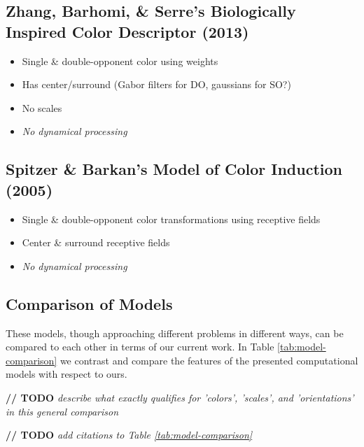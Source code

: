 \documentclass[journal,onecolumn]{IEEEtran}
\begin{document}
\subsection*{Zhang, Barhomi, \& Serre's Biologically Inspired Color Descriptor (2013)}
\begin{itemize}
    \item Single \& double-opponent color using weights
    \item Has center/surround (Gabor filters for DO, gaussians for SO?)
    \item No scales
    \item \textit{No dynamical processing}
\end{itemize}


\subsection*{Spitzer \& Barkan's Model of Color Induction (2005)}
\begin{itemize}
    \item Single \& double-opponent color transformations using receptive fields
    \item Center \& surround receptive fields
    \item \textit{No dynamical processing}
\end{itemize}

\subsection*{Comparison of Models}
These models, though approaching different problems in different ways, can be compared to each other in terms of our current work. In Table \ref{tab:model-comparison} we contrast and compare the features of the presented computational models with respect to ours.

\textbf{// TODO} \textit{describe what exactly qualifies for 'colors', 'scales', and 'orientations' in this general comparison}

\textbf{// TODO} \textit{add citations to Table \ref{tab:model-comparison}}
\end{document}
